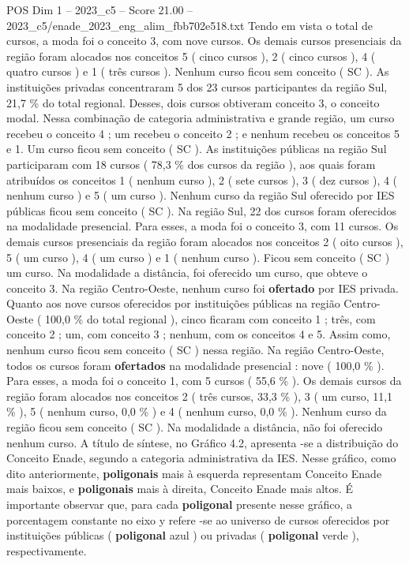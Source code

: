 \begin{textsample}{POS Dim 1 – 2023\_c5 – Score 21.00 – 2023\_c5/enade\_2023\_eng\_alim\_fbb702e518.txt}
Tendo em vista o total de cursos, a moda foi o conceito 3, com nove cursos.
Os demais cursos presenciais da região foram alocados nos conceitos 5 ( cinco cursos ), 2 ( cinco cursos ), 4 ( quatro cursos ) e 1 ( três cursos ).
Nenhum curso ficou sem conceito ( SC ).
As instituições privadas concentraram 5 dos 23 cursos participantes da região Sul, 21,7 \% do total regional.
Desses, dois cursos obtiveram conceito 3, o conceito modal.
Nessa combinação de categoria administrativa e grande região, um curso recebeu o conceito 4 ; um recebeu o conceito 2 ; e nenhum recebeu os conceitos 5 e 1.
Um curso ficou sem conceito ( SC ).
As instituições públicas na região Sul participaram com 18 cursos ( 78,3 \% dos cursos da região ), aos quais foram atribuídos os conceitos 1 ( nenhum curso ), 2 ( sete cursos ), 3 ( dez cursos ), 4 ( nenhum curso ) e 5 ( um curso ).
Nenhum curso da região Sul oferecido por IES públicas ficou sem conceito ( SC ).
Na região Sul, 22 dos cursos foram oferecidos na modalidade presencial.
Para esses, a moda foi o conceito 3, com 11 cursos.
Os demais cursos presenciais da região foram alocados nos conceitos 2 ( oito cursos ), 5 ( um curso ), 4 ( um curso ) e 1 ( nenhum curso ).
Ficou sem conceito ( SC ) um curso.
Na modalidade a distância, foi oferecido um curso, que obteve o conceito 3.
Na região Centro-Oeste, nenhum curso foi \textbf{ofertado} por IES privada.
Quanto aos nove cursos oferecidos por instituições públicas na região Centro-Oeste ( 100,0 \% do total regional ), cinco ficaram com conceito 1 ; três, com conceito 2 ; um, com conceito 3 ; nenhum, com os conceitos 4 e 5.
Assim como, nenhum curso ficou sem conceito ( SC ) nessa região.
Na região Centro-Oeste, todos os cursos foram \textbf{ofertados} na modalidade presencial : nove ( 100,0 \% ).
Para esses, a moda foi o conceito 1, com 5 cursos ( 55,6 \% ).
Os demais cursos da região foram alocados nos conceitos 2 ( três cursos, 33,3 \% ), 3 ( um curso, 11,1 \% ), 5 ( nenhum curso, 0,0 \% ) e 4 ( nenhum curso, 0,0 \% ).
Nenhum curso da região ficou sem conceito ( SC ).
Na modalidade a distância, não foi oferecido nenhum curso.
A título de síntese, no Gráfico 4.2, apresenta -se a distribuição do Conceito Enade, segundo a categoria administrativa da IES.
Nesse gráfico, como dito anteriormente, \textbf{poligonais} mais à esquerda representam Conceito Enade mais baixos, e \textbf{poligonais} mais à direita, Conceito Enade mais altos.
É importante observar que, para cada \textbf{poligonal} presente nesse gráfico, a porcentagem constante no eixo y refere -se ao universo de cursos oferecidos por instituições públicas ( \textbf{poligonal} azul ) ou privadas ( \textbf{poligonal} verde ), respectivamente.

\end{textsample}
